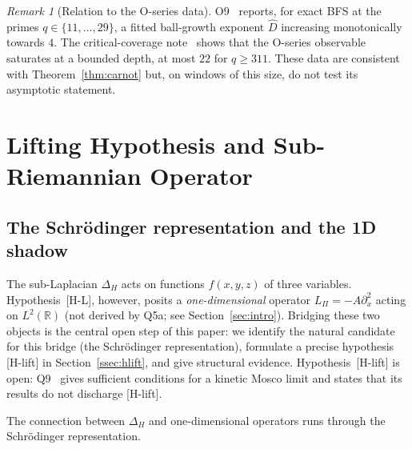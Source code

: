 \documentclass[11pt,a4paper]{article}
\theoremstyle{definition}
\theoremstyle{remark}
\newtheorem{remark}[theorem]{Remark}
\newcommand{\DeltaH}{\Delta_H}
\newcommand{\LPi}{L_\Pi}
\begin{document}
    \begin{remark}[Relation to the O-series data]
O9~\cite{Beau2026a13} reports, for exact BFS at the primes $q \in \{11, \ldots, 29\}$, a fitted ball-growth
exponent $\hat D$ increasing monotonically towards $4$.
The critical-coverage note~\cite{Beau2026ccnote} shows that the O-series observable saturates at a bounded depth,
at most $22$ for $q \ge 311$.
These data are consistent with Theorem~\ref{thm:carnot} but, on windows of this size, do not test its asymptotic
statement.
    \end{remark}

  \section{Lifting Hypothesis and Sub-Riemannian Operator}
  \label{sec:lift}

  \subsection{The Schr\"{o}dinger representation and the 1D shadow}

    The sub-Laplacian $\DeltaH$ acts on functions $f(x,y,z)$ of three variables.
    Hypothesis~[H-L], however, posits a \emph{one-dimensional} operator
    $\LPi = -A\partial_x^2$ acting on $L^2(\mathbb{R})$ (not derived by Q5a; see
    Section~\ref{sec:intro}).
    Bridging these two objects is the central open step of this paper: we identify the
    natural candidate for this bridge (the Schr\"{o}dinger representation), formulate a
    precise hypothesis [H-lift] in Section~\ref{ssec:hlift}, and give structural evidence.
    Hypothesis~[H-lift] is open: Q9~\cite{Beau2026q9} gives sufficient conditions for a kinetic Mosco limit and states
    that its results do not discharge [H-lift].

    The connection between $\DeltaH$ and one-dimensional operators runs through the
    Schr\"{o}dinger representation.
\end{document}
